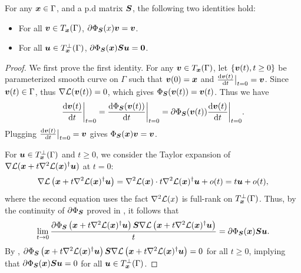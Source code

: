 \begin{lemma}\label{lmm:tangent-space-product}
    For any ${\bm{x}} \in \Gamma$, and a p.d matrix ${\bm{S}}$, the following two identities hold:
    \begin{itemize}
        \item For all ${\bm{v}} \in T_{{\bm{x}}}(\Gamma)$, $\partial \Phi_{{\bm{S}}}(x)  {\bm{v}} = {\bm{v}}$.
        \item For all ${\bm{u}} \in T_{{\bm{x}}}^{\perp}(\Gamma)$, $\partial \Phi_{{\bm{S}}}({\bm{x}}) {\bm{S}} {\bm{u}} =\boldsymbol{0}$.
    \end{itemize}
\end{lemma}
\begin{proof}
    We first prove the first identity. For any ${\bm{v}}\in T_{\bm{x}}(\Gamma)$, let $\{{\bm{v}}(t), t\ge 0\}$ be parameterized smooth curve on $\Gamma$ such that ${\bm{v}}(0) ={\bm{x}}$ and $\frac{\mathrm{d} {\bm{v}}(t)}{\mathrm{d} t}\big|_{t=0}  = {\bm{v}}$. Since ${\bm{v}}(t)\in \Gamma$, thus $\nabla \mathcal{L}({\bm{v}}(t))=0$, which gives $\Phi_{{\bm{S}}}({\bm{v}}(t))={\bm{v}}(t)$. Thus we have
    \begin{align*}
        \frac{\mathrm{d} {\bm{v}}(t)}{\mathrm{d} t}\bigg|_{t=0} =\frac{\mathrm{d} \Phi_{{\bm{S}}}({\bm{v}}(t))}{\mathrm{d} t}\bigg|_{t=0} = \partial \Phi_{{\bm{S}}}({\bm{v}}(t)) \frac{\mathrm{d} {\bm{v}}(t)}{\mathrm{d} t}\bigg|_{t=0}.
    \end{align*}
    Plugging $\frac{\mathrm{d} {\bm{v}}(t)}{\mathrm{d} t}\big|_{t=0} = {\bm{v}}$ gives $\Phi_{{\bm{S}}}({\bm{x}})  {\bm{v}} = {\bm{v}}$.

    For ${\bm{u}} \in  T_{{\bm{x}}}^{\perp}(\Gamma)$ and $t \ge 0$, we consider the Taylor expansion of $\nabla \mathcal{L} ({\bm{x}} + t \nabla^2 \mathcal{L}({\bm{x}})^\dagger {\bm{u}})$ at $t=0$:
    \begin{align*}
        \nabla \mathcal{L} \left({\bm{x}} + t \nabla^2 \mathcal{L}({\bm{x}})^\dagger {\bm{u}}\right) = \nabla^2 \mathcal{L}({\bm{x}}) \cdot t \nabla^2 \mathcal{L}({\bm{x}})^\dagger {\bm{u}} + o(t)
        = t{\bm{u}} + o(t),
    \end{align*}
    where the second equation uses the fact $\nabla^2 \mathcal{L}(x)$ is full-rank on $T_{{\bm{x}}}^{\perp}(\Gamma)$. Thus, by the continuity of $\partial \Phi_{{\bm{S}}}$ proved in , it follows that
    \begin{align*}
        \lim_{t \to 0 }\frac{\partial \Phi_{{\bm{S}}}\left({\bm{x}} + t \nabla^2 \mathcal{L}({\bm{x}})^\dagger {\bm{u}}\right) {\bm{S}} \nabla \mathcal{L} \left({\bm{x}} + t \nabla^2 \mathcal{L}({\bm{x}})^\dagger {\bm{u}}\right)}{t} = \partial \Phi_{{\bm{S}}}({\bm{x}}){\bm{S}} {\bm{u}}.
    \end{align*}
    By , $\partial \Phi_{{\bm{S}}}\left({\bm{x}} + t \nabla^2 \mathcal{L}({\bm{x}})^\dagger {\bm{u}}\right) {\bm{S}} \nabla \mathcal{L} \left({\bm{x}} + t \nabla^2 \mathcal{L}({\bm{x}})^\dagger {\bm{u}}\right) =0$ for all $t \ge 0$, implying that $\partial \Phi_{{\bm{S}}}({\bm{x}}){\bm{S}} {\bm{u}} = 0$ for all ${\bm{u}} \in T_{{\bm{x}}}^\perp(\Gamma)$.
\end{proof}


